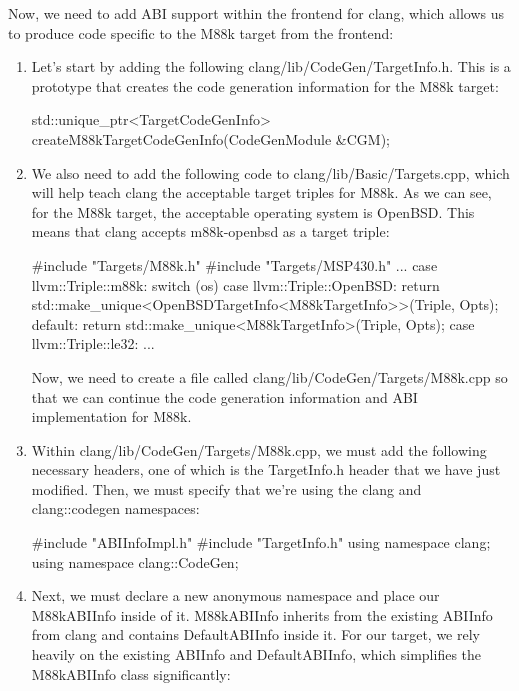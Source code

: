 
Now, we need to add ABI support within the frontend for clang, which allows us to produce code specific to the M88k target from the frontend:

\begin{enumerate}
\item
Let’s start by adding the following clang/lib/CodeGen/TargetInfo.h. This is a prototype that creates the code generation information for the M88k target:

\begin{cpp}
std::unique_ptr<TargetCodeGenInfo>
createM88kTargetCodeGenInfo(CodeGenModule &CGM);
\end{cpp}

\item
We also need to add the following code to clang/lib/Basic/Targets.cpp, which will help teach clang the acceptable target triples for M88k. As we can see, for the M88k target, the acceptable operating system is OpenBSD. This means that clang accepts m88k-openbsd as a target triple:

\begin{cpp}
#include "Targets/M88k.h"
#include "Targets/MSP430.h"
...
    case llvm::Triple::m88k:
        switch (os) {
            case llvm::Triple::OpenBSD:
            return std::make_unique<OpenBSDTargetInfo<M88kTargetInfo>>(Triple, Opts);
        default:
            return std::make_unique<M88kTargetInfo>(Triple, Opts);
        }
    case llvm::Triple::le32:
...
\end{cpp}

Now, we need to create a file called clang/lib/CodeGen/Targets/M88k.cpp so that we can continue the code generation information and ABI implementation for M88k.

\item
Within clang/lib/CodeGen/Targets/M88k.cpp, we must add the following necessary headers, one of which is the TargetInfo.h header that we have just modified. Then, we must specify that we’re using the clang and clang::codegen namespaces:

\begin{cpp}
#include "ABIInfoImpl.h"
#include "TargetInfo.h"
using namespace clang;
using namespace clang::CodeGen;
\end{cpp}

\item
Next, we must declare a new anonymous namespace and place our M88kABIInfo inside of it. M88kABIInfo inherits from the existing ABIInfo from clang and contains DefaultABIInfo inside it. For our target, we rely heavily on the existing ABIInfo and DefaultABIInfo, which simplifies the M88kABIInfo class significantly:


\end{enumerate}
